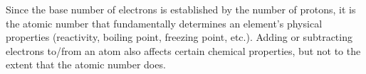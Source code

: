 Since the base number of electrons is established by the number of protons, it is the atomic number that fundamentally determines an element's physical properties (reactivity, boiling point, freezing point, etc.).  Adding or subtracting electrons to/from an atom also affects certain chemical properties, but not to the extent that the atomic number does.











